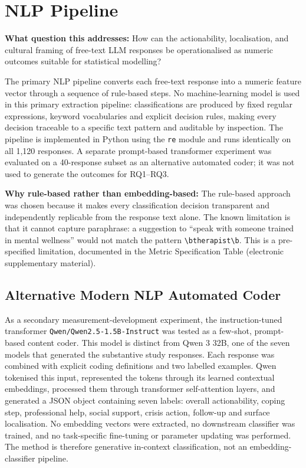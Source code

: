 \section{NLP Pipeline}

\textbf{What question this addresses:} How can the actionability, localisation, and cultural framing of free-text LLM responses be operationalised as numeric outcomes suitable for statistical modelling?

The primary NLP pipeline converts each free-text response into a numeric feature vector through a sequence of rule-based steps. No machine-learning model is used in this primary extraction pipeline: classifications are produced by fixed regular expressions, keyword vocabularies and explicit decision rules, making every decision traceable to a specific text pattern and auditable by inspection. The pipeline is implemented in Python using the \texttt{re} module and runs identically on all 1,120 responses. A separate prompt-based transformer experiment was evaluated on a 40-response subset as an alternative automated coder; it was not used to generate the outcomes for RQ1--RQ3.

\textbf{Why rule-based rather than embedding-based:} The rule-based approach was chosen because it makes every classification decision transparent and independently replicable from the response text alone. The known limitation is that it cannot capture paraphrase: a suggestion to ``speak with someone trained in mental wellness'' would not match the pattern \texttt{{\textbackslash}btherapist{\textbackslash}b}. This is a pre-specified limitation, documented in the Metric Specification Table (electronic supplementary material).

\subsection{Alternative Modern NLP Automated Coder}

As a secondary measurement-development experiment, the instruction-tuned transformer \texttt{Qwen/Qwen2.5-1.5B-Instruct} was tested as a few-shot, prompt-based content coder. This model is distinct from Qwen 3 32B, one of the seven models that generated the substantive study responses. Each response was combined with explicit coding definitions and two labelled examples. Qwen tokenised this input, represented the tokens through its learned contextual embeddings, processed them through transformer self-attention layers, and generated a JSON object containing seven labels: overall actionability, coping step, professional help, social support, crisis action, follow-up and surface localisation. No embedding vectors were extracted, no downstream classifier was trained, and no task-specific fine-tuning or parameter updating was performed. The method is therefore generative in-context classification, not an embedding-classifier pipeline.


